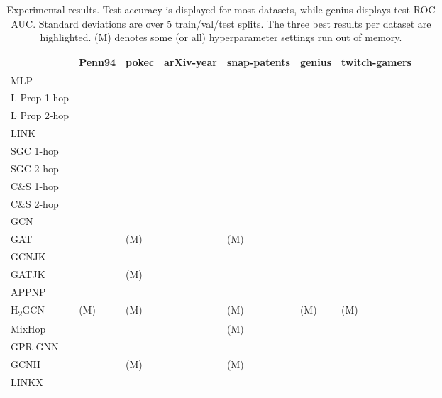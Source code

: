 \documentclass{article}
\newcommand{\bestcell}{\cellcolor{blue!25}}
\begin{document}
\begin{table}[ht]
    \vspace{-5pt}
    \centering
    \caption{Experimental results. Test accuracy is displayed for most datasets, while genius displays test ROC AUC. Standard deviations are over 5 train/val/test splits. The three best results per dataset are highlighted. (M) denotes some  (or all) hyperparameter settings run out of memory.  }
    \label{tab:results}
    {\tiny
    \begin{tabular}{lllllllll}
    \toprule
	 & Penn94 &  pokec &   arXiv-year & snap-patents & genius & twitch-gamers \\
    \midrule
		MLP &   &  &  &  &  &  \\    
     \hdashline
     L Prop 1-hop &  &   &  &  &  &   \\ 
     L Prop 2-hop &  &   &  &  &  &   \\ 
     LINK  &  &   & \bestcell  & \bestcell  &  &  \\    
     \hdashline
     SGC 1-hop &  &   &   &    &   &  \\    
     SGC 2-hop &  &   &  &  &  &   \\    
     C\&S 1-hop &   &   &  &  &  &  \\    
     C\&S 2-hop &  &  \bestcell   &  &  &  & \bestcell  \\    
     \hdashline
     GCN &  &   &  &  &  &  \\
     GAT &  &  (M)  &  &  (M)  & 
 &  \\
     GCNJK &  &   &   &    &  &  \\
     GATJK &  &  (M)  &  &   &  & \\
     APPNP &   &   &   &  &  & \\
     \hdashline
     H\textsubscript{2}GCN & (M) & (M)  &  & (M) & (M) & (M) \\
     MixHop & \bestcell  & \bestcell   & \bestcell  & \bestcell  (M) & \bestcell  & \bestcell   \\
     GPR-GNN &   &  &    &    &   & \\
	 GCNII & \bestcell  &  (M)  &  &  (M)  & \bestcell  & \\
	 \midrule
	 LINKX &  \bestcell  & \bestcell   &  \bestcell  & \bestcell  & \bestcell  & \bestcell \\
    \bottomrule
    \end{tabular}
    }
    \vspace{-10pt}
\end{table}
\end{document}
